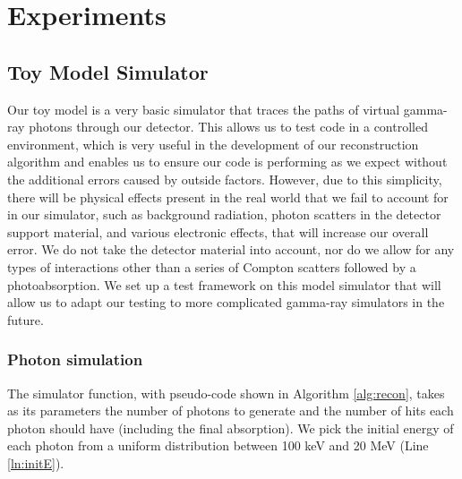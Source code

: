 \chapter{Experiments}

\section{Toy Model Simulator}
Our toy model is a very basic simulator that traces the paths of virtual gamma-ray photons through our detector. This allows us to test code in a controlled environment, which is very useful in the development of our reconstruction algorithm and enables us to ensure our code is performing as we expect without the additional errors caused by outside factors. However, due to this simplicity, there will be physical effects present in the real world that we fail to account for in our simulator, such as background radiation, photon scatters in the detector support material, and various electronic effects, that will increase our overall error. We do not take the detector material into account, nor do we allow for any types of interactions other than a series of Compton scatters followed by a photoabsorption. We set up a test framework on this model simulator that will allow us to adapt our testing to more complicated gamma-ray simulators in the future.

\subsection{Photon simulation} \label{toy_model}
The simulator function, with pseudo-code shown in Algorithm \ref{alg:recon}, takes as its parameters the number of photons to generate and the number of hits each photon should have (including the final absorption). We pick the initial energy of each photon from a uniform distribution between 100 keV and 20 MeV (Line \ref{ln:initE}).


